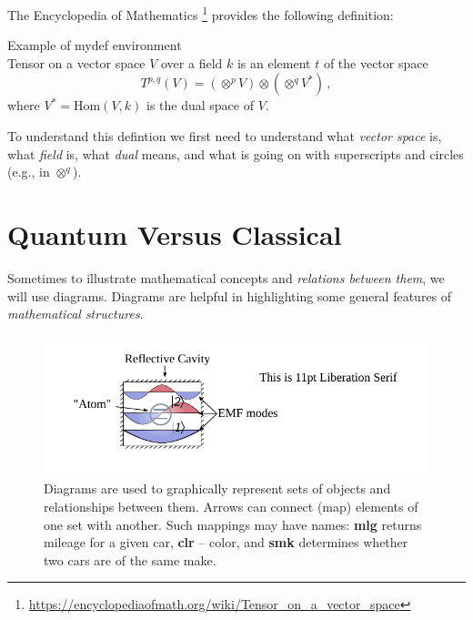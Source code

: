 The Encyclopedia of Mathematics
\footnote{\url{https://encyclopediaofmath.org/wiki/Tensor_on_a_vector_space}}
provides the following definition:

\begin{mydef}{Example of mydef environment}\\
  \small
Tensor on a vector space $V$ over a field $k$ is an element $t$ of the
vector space
\begin{equation*}
	T^{p,q} (V) = (\otimes^p V)\otimes (\otimes^q V^*)\,,
\end{equation*}
where $V^*=\textrm{Hom}(V, k)$ is the dual space of $V$.
\label{tcb:tensorDefinition1}
\end{mydef}
To understand this defintion we first need to understand what
\emph{vector space} is, what \emph{field} is, what \emph{dual} means,
and what is going on with superscripts and circles (e.g., in
$\otimes^q$).


\section{Quantum Versus Classical}
Sometimes to illustrate mathematical concepts and \emph{relations between them},
we will use diagrams. Diagrams are helpful in highlighting
some general features of \emph{mathematical structures}.

\begin{figure}[htbp]
  \centering
  \includegraphics[scale=1.0]{defaultFigureTemplate}
  \caption{Diagrams are used to graphically represent sets of objects
    and relationships between them. Arrows can connect (map) elements
    of one set with another. Such mappings may have names: {\bf mlg}
    returns mileage for a given car, {\bf clr} -- color, and {\bf smk}
  determines whether two cars are of the same make.}
  \label{fig:diagrams}
\end{figure}

